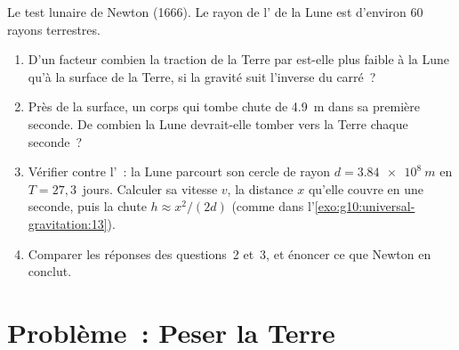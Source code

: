 \begin{exercise}[$\star\star\star$]\label{exo:g10:universal-gravitation:15}
Le test lunaire de Newton (1666). Le rayon de l' de la
Lune est d'environ $60$ rayons terrestres.
\begin{enumerate}
  \item D'un facteur combien la traction de la Terre par
         est-elle plus faible à la Lune qu'à la surface
        de la Terre, si la gravité suit l'inverse du carré~?
  \item Près de la surface, un corps qui tombe chute de \qty{4.9}{m}
        dans sa première seconde. De combien la Lune devrait-elle
        tomber vers la Terre chaque seconde~?
  \item Vérifier contre l'~: la Lune parcourt son cercle
        de rayon $d = \qty{3.84e8}{m}$ en $T = 27{,}3$~jours. Calculer
        sa vitesse $v$, la distance $x$ qu'elle couvre en une seconde,
        puis la chute $h \approx x^2/(2d)$ (comme dans
        l'\cref{exo:g10:universal-gravitation:13}).
  \item Comparer les réponses des questions~2 et~3, et énoncer ce que
        Newton en conclut.
\end{enumerate}
\end{exercise}

\section{Problème~: Peser la Terre}

